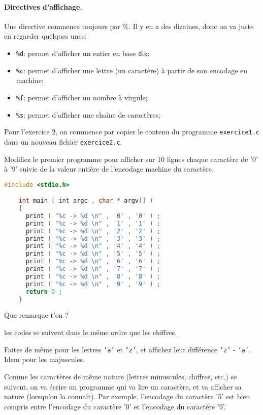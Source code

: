 \paragraph{Directives d'affichage.} Une directive commence toujours
par \%. Il y en a des dizaines, donc on va juste en regarder quelques unes:
\begin{itemize}
\item \texttt{\%d}: permet d'afficher un entier en base \texttt{d}ix;
\item \texttt{\%c}: permet d'afficher une lettre (un caractère) à partir de son encodage en machine;
\item \texttt{\%f}: permet d'afficher un nombre à virgule;
\item \texttt{\%s}: permet d'afficher une chaîne de caractères;
\end{itemize}
Pour l'exercice 2, on commence par copier le contenu du programme
\texttt{exercice1.c} dans un nouveau fichier \texttt{exercice2.c}.


\question Modifiez le premier programme pour afficher sur 10 lignes
chaque caractère de '0' à '9' suivie de la valeur entière de l'encodage machine du caractère.
\begin{solutioncachee}
  \begin{lstlisting}[language=C]
    #include <stdio.h>

    int main ( int argc , char * argv[] ) 
    {
      print ( "%c -> %d \n" , '0' , '0' ) ;
      print ( "%c -> %d \n" , '1' , '1' ) ;
      print ( "%c -> %d \n" , '2' , '2' ) ;
      print ( "%c -> %d \n" , '3' , '3' ) ;
      print ( "%c -> %d \n" , '4' , '4' ) ;
      print ( "%c -> %d \n" , '5' , '5' ) ;
      print ( "%c -> %d \n" , '6' , '6' ) ;
      print ( "%c -> %d \n" , '7' , '7' ) ;
      print ( "%c -> %d \n" , '8' , '8' ) ;
      print ( "%c -> %d \n" , '9' , '9' ) ;
      return 0 ; 
    }
  \end{lstlisting}
\end{solutioncachee}
Que remarque-t'on ?

\begin{solutioncachee}
  les codes se suivent dans le même ordre que les chiffres.
\end{solutioncachee}

\question Faites de même pour les lettres \texttt{'a'} et \texttt{'z'}, et affichez leur
différence \texttt{'z'} - \texttt{'a'}. Idem pour les majuscules.

\prerequis{}
Comme les caractères de même nature (lettres minuscules, chiffres, etc.)
se suivent, on va écrire un programme qui va lire un caractère, et va
afficher sa nature (lorsqu'on la connaît). Par exemple, 
l'encodage du caractère '5' est bien compris entre l'encodage du caractère '0'
et l'encodage du caractère '9'.

